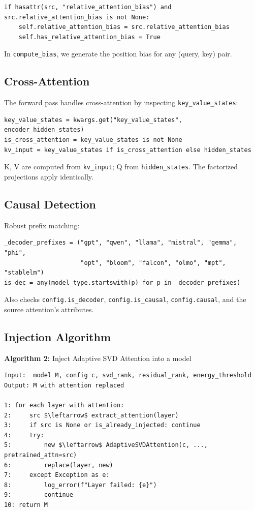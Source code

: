 \begin{lstlisting}
if hasattr(src, "relative_attention_bias") and src.relative_attention_bias is not None:
    self.relative_attention_bias = src.relative_attention_bias
    self.has_relative_attention_bias = True
\end{lstlisting}

In \texttt{compute\_bias}, we generate the position bias for any (query, key) pair.

\subsection{Cross-Attention}

The forward pass handles cross-attention by inspecting \texttt{key\_value\_states}:

\begin{lstlisting}
key_value_states = kwargs.get("key_value_states", encoder_hidden_states)
is_cross_attention = key_value_states is not None
kv_input = key_value_states if is_cross_attention else hidden_states
\end{lstlisting}

K, V are computed from \texttt{kv\_input}; Q from \texttt{hidden\_states}. The factorized 
projections apply identically.

\subsection{Causal Detection}

Robust prefix matching:

\begin{lstlisting}
_decoder_prefixes = ("gpt", "qwen", "llama", "mistral", "gemma", "phi",
                     "opt", "bloom", "falcon", "olmo", "mpt", "stablelm")
is_dec = any(model_type.startswith(p) for p in _decoder_prefixes)
\end{lstlisting}

Also checks \texttt{config.is\_decoder}, \texttt{config.is\_causal}, \texttt{config.causal}, and 
the source attention's attributes.

\subsection{Injection Algorithm}

\textbf{Algorithm 2:} Inject Adaptive SVD Attention into a model
\begin{lstlisting}
Input:  model M, config c, svd_rank, residual_rank, energy_threshold
Output: M with attention replaced

1: for each layer with attention:
2:     src $\leftarrow$ extract_attention(layer)
3:     if src is None or is_already_injected: continue
4:     try:
5:         new $\leftarrow$ AdaptiveSVDAttention(c, ..., pretrained_attn=src)
6:         replace(layer, new)
7:     except Exception as e:
8:         log_error(f"Layer failed: {e}")
9:         continue
10: return M
\end{lstlisting}

